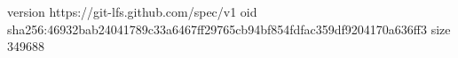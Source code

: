 version https://git-lfs.github.com/spec/v1
oid sha256:46932bab24041789c33a6467ff29765cb94bf854fdfac359df9204170a636ff3
size 349688
